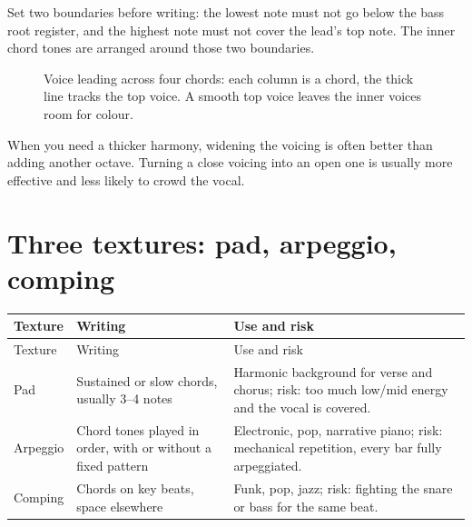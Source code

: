 Set two boundaries before writing: the lowest note must not go below the bass root register, and the highest note must not cover the lead's top note. The inner chord tones are arranged around those two boundaries.

\begin{figure}[htbp]
  \centering
  \caption{Voice leading across four chords: each column is a chord, the thick line tracks the top voice. A smooth top voice leaves the inner voices room for colour.}
  \label{fig:voicing}
\end{figure}

\begin{tipbox}
When you need a thicker harmony, widening the voicing is often better than adding another octave. Turning a close voicing into an open one is usually more effective and less likely to crowd the vocal.
\end{tipbox}

\section{Three textures: pad, arpeggio, comping}
\label{sec:textures}

\begin{longtable}{p{}p{}p{}}
\toprule
Texture & Writing & Use and risk \\
\midrule
\endfirsthead
\toprule
Texture & Writing & Use and risk \\
\midrule
\endhead
Pad & Sustained or slow chords, usually 3--4 notes & Harmonic background for verse and chorus; risk: too much low/mid energy and the vocal is covered. \\
Arpeggio & Chord tones played in order, with or without a fixed pattern & Electronic, pop, narrative piano; risk: mechanical repetition, every bar fully arpeggiated. \\
Comping & Chords on key beats, space elsewhere & Funk, pop, jazz; risk: fighting the snare or bass for the same beat. \\
\bottomrule
\end{longtable}

